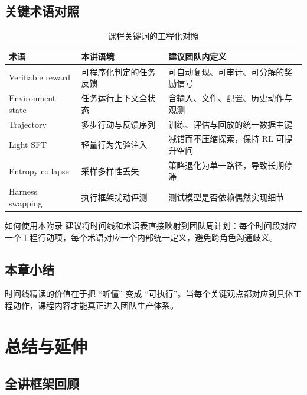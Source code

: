 \documentclass[a4paper]{article}
\begin{document}
\subsection{关键术语对照}
\begin{table}[H]
\centering
\begin{tabular}{p{3.0cm}p{2.8cm}p{4.5cm}}
\toprule
\textbf{术语} & \textbf{本讲语境} & \textbf{建议团队内定义} \\
\midrule
Verifiable reward & 可程序化判定的任务反馈 & 可自动复现、可审计、可分解的奖励信号 \\
Environment state & 任务运行上下文全状态 & 含输入、文件、配置、历史动作与观测 \\
Trajectory & 多步行动与反馈序列 & 训练、评估与回放的统一数据主键 \\
Light SFT & 轻量行为先验注入 & 减错而不压缩探索，保持 RL 可提升空间 \\
Entropy collapse & 采样多样性丢失 & 策略退化为单一路径，导致长期停滞 \\
Harness swapping & 执行框架扰动评测 & 测试模型是否依赖偶然实现细节 \\
\bottomrule
\end{tabular}
\caption{课程关键词的工程化对照}
\end{table}

\begin{knowledgebox}{如何使用本附录}
建议将时间线和术语表直接映射到团队周计划：每个时间段对应一个工程行动项，每个术语对应一个内部统一定义，避免跨角色沟通歧义。
\end{knowledgebox}

\subsection{本章小结}
时间线精读的价值在于把 ``听懂'' 变成 ``可执行''。当每个关键观点都对应到具体工程动作，课程内容才能真正进入团队生产体系。

\section{总结与延伸}

\subsection{全讲框架回顾}
\end{document}
